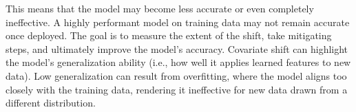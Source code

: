 This means that the model may become less accurate or even completely ineffective. A highly performant model on training data may not remain accurate once deployed. The goal is to measure the extent of the shift, take mitigating steps, and ultimately improve the model’s accuracy. Covariate shift can highlight the model’s generalization ability (i.e., how well it applies learned features to new data). Low generalization can result from overfitting, where the model aligns too closely with the training data, rendering it ineffective for new data drawn from a different distribution.